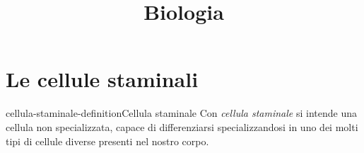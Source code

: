 \documentclass[preview]{standalone}
\begin{document}
\title{Biologia}
\genpage

\section{Le cellule staminali}

\begin{snippetdefinition}{cellula-staminale-definition}{Cellula staminale}
    Con \textit{cellula staminale} si intende una cellula non specializzata,
    capace di differenziarsi specializzandosi in uno dei molti tipi di cellule
    diverse presenti nel nostro corpo.
\end{snippetdefinition}

\end{document}
